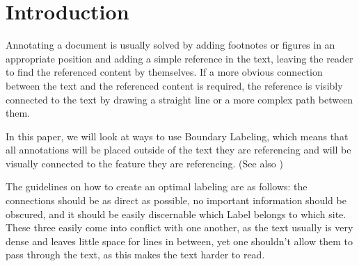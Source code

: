 \documentclass[11pt,a4paper]{vutinfth}
\begin{document}
\frontmatter
\addstatementpage






\tableofcontents

\mainmatter



\section{Introduction}%
Annotating a document is usually solved by adding footnotes or figures in an appropriate position and adding a simple reference in the text, leaving the reader to find the referenced content by themselves. If a more obvious connection between the text and the referenced content is required, the reference is visibly connected to the text by drawing a straight line or a more complex path between them.

In this paper, we will look at ways to use Boundary Labeling, which means that all annotations will be placed outside of the text they are referencing and will be visually connected to the feature they are referencing. (See also \cite{Bekos2007}) 

The guidelines on how to create an optimal labeling are as follows: the connections should be as direct as possible, no important information should be obscured, and it should be easily discernable which Label belongs to which site. These three easily come into conflict with one another,  as the text usually is very dense and leaves little space for lines in between, yet one shouldn't allow them to pass through the text, as this makes the text harder to read. 
\end{document}
